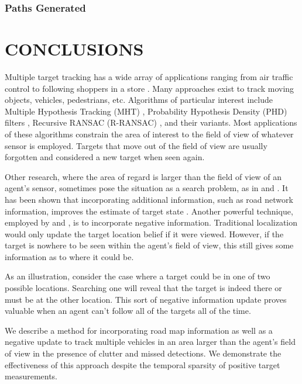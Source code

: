 \documentclass[letterpaper, 10 pt, conference]{ieeeconf}  %
\begin{document}
\subsubsection{Paths Generated}
\section{CONCLUSIONS}\label{conclusions}

Multiple target tracking has a wide array of applications ranging from air traffic control \cite{Li1993} to following shoppers in a store \cite{Liu2007}. Many approaches exist to track moving objects, vehicles, pedestrians, etc. Algorithms of particular interest include Multiple Hypothesis Tracking (MHT) \cite{Reid1979}, Probability Hypothesis Density (PHD) filters \cite{Clark2007}, Recursive RANSAC (R-RANSAC) \cite{Niedfeldt2014}, and their variants. Most applications of these algorithms constrain the area of interest to the field of view of whatever sensor is employed. Targets that move out of the field of view are usually forgotten and considered a new target when seen again.

Other research, where the area of regard is larger than the field of view of an agent's sensor, sometimes pose the situation as a search problem, as in \cite{Allik2017} and \cite{Wong2005}. It has been shown that incorporating additional information, such as road network information, improves the estimate of target state \cite{Cheng2007}. Another powerful technique, employed by \cite{Allik2017} and \cite{Ahmed2017}, is to incorporate negative information. Traditional localization would only update the target location belief if it were viewed. However, if the target is nowhere to be seen within the agent's field of view, this still gives some information as to where it could be.

As an illustration, consider the case where a target could be in one of two possible locations. Searching one will reveal that the target is indeed there or must be at the other location. This sort of negative information update proves valuable when an agent can't follow all of the targets all of the time.

We describe a method for incorporating road map information as well as a negative update to track multiple vehicles in an area larger than the agent's field of view in the presence of clutter and missed detections. We demonstrate the effectiveness of this approach despite the temporal sparsity of positive target measurements.
\end{document}
